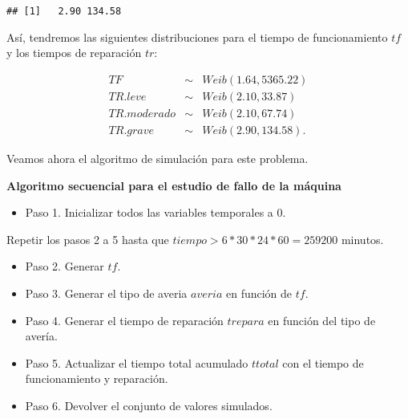 \documentclass[
]{book}
\providecommand{\tightlist}{%
  \setlength{\itemsep}{0pt}\setlength{\parskip}{0pt}}
\newenvironment{silverbox}{
  \definecolor{shadecolor}{rgb}{192, 192, 192}  
  \color{black}
  \begin{shaded}}
 {\end{shaded}}
\theoremstyle{definition}
\theoremstyle{definition}
\theoremstyle{definition}
\theoremstyle{definition}
\theoremstyle{remark}
\begin{document}
\begin{verbatim}
## [1]   2.90 134.58
\end{verbatim}

Así, tendremos las siguientes distribuciones para el tiempo de funcionamiento \(tf\) y los tiempos de reparación \(tr\):

\begin{eqnarray*}
TF &\sim& Weib(1.64,5365.22) \\
TR.leve &\sim& Weib(2.10, 33.87)  \\
TR.moderado &\sim& Weib(2.10, 67.74)  \\
TR.grave &\sim& Weib(2.90, 134.58).  
\end{eqnarray*}

Veamos ahora el algoritmo de simulación para este problema.

\begin{silverbox}

\textbf{Algoritmo secuencial para el estudio de fallo de la máquina}

\begin{itemize}
\tightlist
\item
  Paso 1. Inicializar todos las variables temporales a 0.
\end{itemize}

Repetir los pasos 2 a 5 hasta que \(tiempo > 6*30*24*60 = 259200\) minutos.

\begin{itemize}
\item
  Paso 2. Generar \(tf\).\\
\item
  Paso 3. Generar el tipo de averia \(averia\) en función de \(tf\).
\item
  Paso 4. Generar el tiempo de reparación \(trepara\) en función del tipo de avería.
\item
  Paso 5. Actualizar el tiempo total acumulado \(ttotal\) con el tiempo de funcionamiento y reparación.
\item
  Paso 6. Devolver el conjunto de valores simulados.
\end{itemize}

\end{silverbox}
\end{document}
